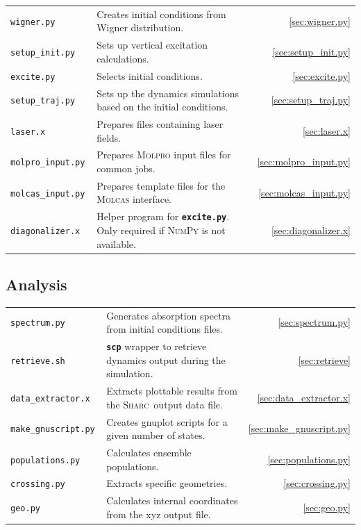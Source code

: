 \documentclass[a4paper,11pt,DIV=15,openany,twoside=false]{scrbook}
\newcommand{\sharc}{\textsc{Sharc}}
\newcommand{\ttt}[1]{\textbf{\texttt{#1}}}
\begin{document}
\begin{tabular}{>{\tt}lp{9.5cm}r}
  wigner.py             &Creates initial conditions from Wigner distribution.                   &\ref{sec:wigner.py}\\
  setup\_init.py        &Sets up vertical excitation calculations.                              &\ref{sec:setup_init.py}\\
  excite.py             &Selects initial conditions.                                            &\ref{sec:excite.py}\\
  setup\_traj.py        &Sets up the dynamics simulations based on the initial conditions.      &\ref{sec:setup_traj.py}\\
  laser.x               &Prepares files containing laser fields.                                &\ref{sec:laser.x}\\
  molpro\_input.py      &Prepares \textsc{Molpro} input files for common jobs.                  &\ref{sec:molpro_input.py}\\
  molcas\_input.py      &Prepares template files for the \textsc{Molcas} interface.             &\ref{sec:molcas_input.py}\\
  diagonalizer.x        &Helper program for \ttt{excite.py}. Only required if \textsc{NumPy} is not available.            &\ref{sec:diagonalizer.x}\\
\end{tabular}

\subsection{Analysis}

\begin{tabular}{>{\tt}lp{9.5cm}r}
  spectrum.py           &Generates absorption spectra from initial conditions files.            &\ref{sec:spectrum.py}\\
  retrieve.sh           &\ttt{scp} wrapper to retrieve dynamics output during the simulation.   &\ref{sec:retrieve}\\
  data\_extractor.x     &Extracts plottable results from the \sharc\ output data file.          &\ref{sec:data_extractor.x}\\
  make\_gnuscript.py    &Creates gnuplot scripts for a given number of states.                  &\ref{sec:make_gnuscript.py}\\
  populations.py        &Calculates ensemble populations.                                       &\ref{sec:populations.py}\\
  crossing.py           &Extracts specific geometries.                                          &\ref{sec:crossing.py}\\
  geo.py                &Calculates internal coordinates from the xyz output file.              &\ref{sec:geo.py}\\
\end{tabular}
\end{document}
